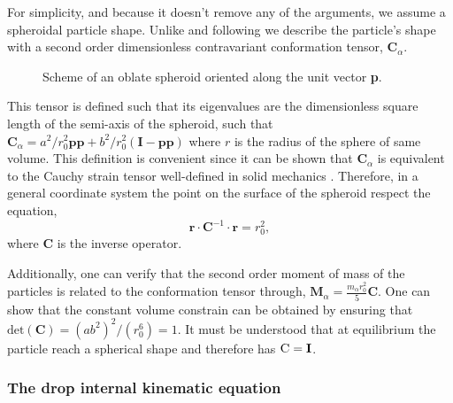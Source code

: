 For simplicity, and because it doesn't remove any of the arguments, we assume a spheroidal particle shape. 
Unlike \citet{goddard1967nonlinear,lhuillier1987phenomenology} and following \citet{maffettone1998equation,mwasame2017macroscopic} we describe the particle's shape with a second order dimensionless contravariant conformation tensor, $\textbf{C}_\alpha$.
\begin{figure}[h!]
    \centering
    \hfill
    \hfill
    \caption{Scheme of an  oblate spheroid oriented along the unit vector \textbf{p}.}
    \label{fig:scheme2}
\end{figure}
This tensor is defined such that its eigenvalues are the dimensionless square length of the semi-axis of the spheroid, such that $\textbf{C}_\alpha = a^2/r_0^2 \textbf{pp} + b^2 /r_0^2 (\textbf{I}-\textbf{pp})$ where $r$ is the radius of the sphere of same volume. 
This definition is convenient since it can be shown that $\textbf{C}_\alpha$ is equivalent to the Cauchy strain tensor well-defined in solid mechanics \citet{mwasame2017macroscopic}. 
Therefore, in a general coordinate system the point on the surface of the spheroid respect the equation, 
\begin{equation*}
    \textbf{r}\cdot\textbf{C}^{-1}\cdot\textbf{r} = r_0^2,
\end{equation*}
where $\textbf{C}$ is the inverse operator. 

Additionally, one can verify that the second order moment of mass of the particles is related to the conformation tensor through, $\textbf{M}_\alpha = \frac{m_\alpha  r_0^2}{5} \textbf{C}$. 
One can show that the constant volume constrain can be obtained by ensuring that $\text{det}(\textbf{C}) = (ab^2)^2 /(r_0^6) = 1$. 
It must be understood that at equilibrium the particle reach a spherical shape and therefore has $\textsc{C} = \textbf{I}$. 

\subsubsection*{The drop internal kinematic equation}



